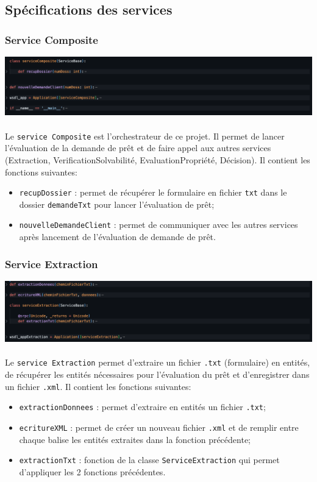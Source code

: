 \documentclass{article}
\begin{document}
	\subsection{Spécifications des services}
    \subsubsection{Service Composite}
      \includegraphics[width=\textwidth]{Images/7.2/serviceComposite.png}\\
      \\ 
      Le \texttt{service Composite} est l'orchestrateur de ce projet. Il permet de lancer l'évaluation de la demande de prêt et de faire appel aux autres services (Extraction, VerificationSolvabilité, EvaluationPropriété, Décision). Il contient les fonctions suivantes:
      \begin{itemize}
          \item \texttt{recupDossier} : permet de récupérer le formulaire en fichier \texttt{txt} dans le dossier \texttt{demandeTxt} pour lancer l'évaluation de prêt;
          \item \texttt{nouvelleDemandeClient} : permet de communiquer avec les autres services après lancement de l'évaluation de demande de prêt.
      \end{itemize}
    \subsubsection{Service Extraction}
      \includegraphics[width=\textwidth]{Images/7.2/serviceExtraction.png}\\
      \\
      Le \texttt{service Extraction} permet d'extraire un fichier \texttt{.txt} (formulaire) en entités, de récupérer les entités nécessaires pour l'évaluation du prêt et d'enregistrer dans un fichier \texttt{.xml}. Il contient les fonctions suivantes:
      \begin{itemize}
          \item \texttt{extractionDonnees} : permet d'extraire en entités un fichier \texttt{.txt};
          \item \texttt{ecritureXML} : permet de créer un nouveau fichier \texttt{.xml} et de remplir entre chaque balise les entités extraites dans la fonction précédente;
          \item \texttt{extractionTxt} : fonction de la classe \texttt{ServiceExtraction} qui permet d'appliquer les 2 fonctions précédentes.
      \end{itemize}
\end{document}
